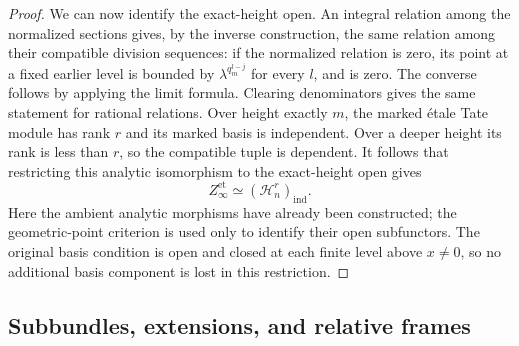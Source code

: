 \begin{proof}
We can now identify the exact-height open. An integral relation among
the normalized sections gives, by the inverse construction, the same
relation among their compatible division sequences: if the normalized
relation is zero, its point at a fixed earlier level is bounded by
$\lambda^{q_m^{l-j}}$ for every $l$, and is zero. The converse follows
by applying the limit formula. Clearing denominators gives the same
statement for rational relations. Over height exactly $m$, the marked
\'{e}tale Tate module has rank $r$ and its marked basis is independent.
Over a deeper height its rank is less than $r$, so the compatible
tuple is dependent. It follows that restricting this analytic isomorphism to the
exact-height open gives
\begin{equation}\label{eq:tower-etale-independent}
 Z_\infty^{\mathrm{et}}\simeq(\mathcal H_n^r)_{\mathrm{ind}}.
\end{equation}
Here the ambient analytic morphisms have already been constructed;
the geometric-point criterion is used only to identify their open
subfunctors. The original basis condition is open and closed at each
finite level above $x\ne0$, so no additional basis component is
lost in this restriction.
\end{proof}

\subsection{Subbundles, extensions, and relative frames}


